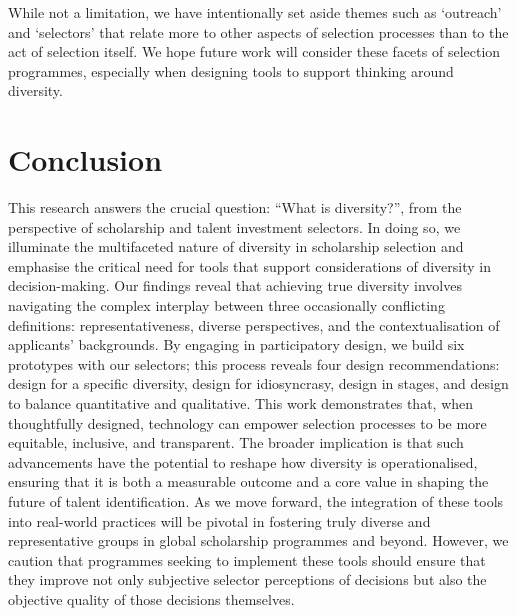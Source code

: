 While not a limitation, we have intentionally set aside themes such as `outreach' and `selectors' that relate more to other aspects of selection processes than to the act of selection itself. We hope future work will consider these facets of selection programmes, especially when designing tools to support thinking around diversity.

\section{Conclusion}
This research answers the crucial question: ``What is diversity?'', from the perspective of scholarship and talent investment selectors. In doing so, we illuminate the multifaceted nature of diversity in scholarship selection and emphasise the critical need for tools that support considerations of diversity in decision-making. Our findings reveal that achieving true diversity involves navigating the complex interplay between three occasionally conflicting definitions: representativeness, diverse perspectives, and the contextualisation of applicants' backgrounds. By engaging in participatory design, we build six prototypes with our selectors; this process reveals four design recommendations: design for a specific diversity, design for idiosyncrasy, design in stages, and design to balance quantitative and qualitative. This work demonstrates that, when thoughtfully designed, technology can empower selection processes to be more equitable, inclusive, and transparent. The broader implication is that such advancements have the potential to reshape how diversity is operationalised, ensuring that it is both a measurable outcome and a core value in shaping the future of talent identification. As we move forward, the integration of these tools into real-world practices will be pivotal in fostering truly diverse and representative groups in global scholarship programmes and beyond. However, we caution that programmes seeking to implement these tools should ensure that they improve not only subjective selector perceptions of decisions but also the objective quality of those decisions themselves.